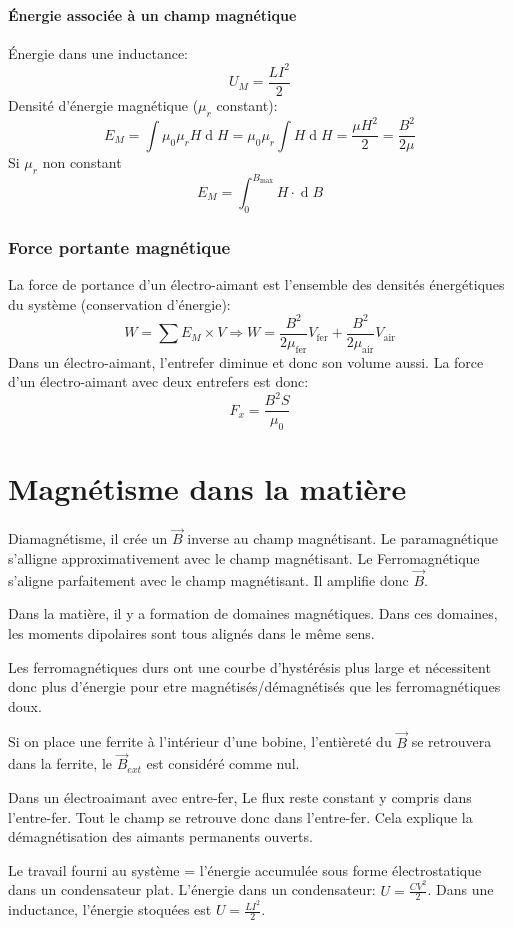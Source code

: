 \documentclass[11pt,a4paper]{article}
\newcommand{\B}{\vec B}
\DeclareMathOperator{\diff}{d}
\newcommand{\dif}{\diff\!}
\begin{document}
\subsection{Énergie associée à un champ magnétique}
Énergie dans une inductance:
\[ U_M = \frac{LI^2}{2} \]
Densité d'énergie magnétique ($\mu_r$ constant):
\[ E_M = \int \mu_0 \mu_r H \dif H = \mu_0 \mu_r \int H \dif H = \frac{\mu H^2}{2} = \frac{B^2}{2\mu} \]
Si $\mu_r$ non constant
\[ E_M = \int_0^{B_\mathrm{max}} H \cdot \dif B \]

\section{Force portante magnétique}
La force de portance d'un électro-aimant est l'ensemble des densités énergétiques du système (conservation d'énergie):
$$W = \sum E_M \times V \Rightarrow W = \frac{B^2}{2\mu_\mathrm{fer}}V_\mathrm{fer} + \frac{B^2}{2\mu_\mathrm{air}}V_\mathrm{air}$$
Dans un électro-aimant, l'entrefer diminue et donc son volume aussi.
La force d'un électro-aimant avec deux entrefers est donc:
\[ F_x = \frac{B^2S}{\mu_0} \]

\part{Magnétisme dans la matière}
Diamagnétisme, il crée un $\B$ inverse au champ magnétisant.
Le paramagnétique s'alligne approximativement avec le champ magnétisant.
Le Ferromagnétique s'aligne parfaitement avec le champ magnétisant.
Il amplifie donc $\B$.

Dans la matière, il y a formation de domaines magnétiques.
Dans ces domaines, les moments dipolaires sont tous alignés dans le même sens.

Les ferromagnétiques durs ont une courbe d'hystérésis plus large et nécessitent donc plus d'énergie pour etre magnétisés/démagnétisés que les ferromagnétiques doux.

Si on place une ferrite à l'intérieur d'une bobine, l'entièreté du $\B$ se retrouvera dans la ferrite, le $\B_{ext}$ est considéré comme nul.

Dans un électroaimant avec entre-fer, Le flux reste constant y compris dans l'entre-fer.
Tout le champ se retrouve donc dans l'entre-fer.
Cela explique la démagnétisation des aimants permanents ouverts.

Le travail fourni au système = l'énergie accumulée sous forme électrostatique dans un condensateur plat.
L'énergie dans un condensateur: $U = \frac{CV^2}{2}$.
Dans une inductance, l'énergie stoquées est $U = \frac{LI^2}{2}$.
\end{document}
